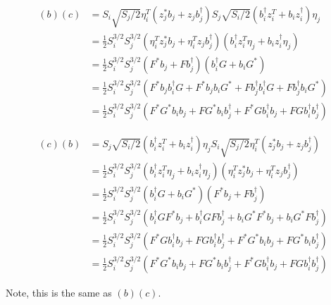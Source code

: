 \documentclass{article}
\begin{document}
\begin{align}
(b)(c) &= S_i \sqrt{S_j/2} \eta^T_i \left(z_j^* b_j + z_j b_j^\dagger\right) S_j \sqrt{S_i/2} \left(b_i^\dagger z_i^T + b_i z_i^\dagger \right) \eta_j \\
&= \frac{1}{2} S_i^{3/2} S_j^{3/2} \left(\eta^T_i z_j^* b_j + \eta^T_i z_j b_j^\dagger\right) \left(b_i^\dagger z_i^T \eta_j + b_i z_i^\dagger \eta_j\right) \\
&= \frac{1}{2} S_i^{3/2} S_j^{3/2} \left(F^* b_j + F b_j^\dagger\right) \left(b_i^\dagger G + b_i G^* \right) \\
&= \frac{1}{2} S_i^{3/2} S_j^{3/2} \left(
F^* b_j b_i^\dagger G +
F^* b_j b_i G^* +
F b_j^\dagger b_i^\dagger G +
F b_j^\dagger b_i G^*
\right) \\
&= \frac{1}{2} S_i^{3/2} S_j^{3/2} \left(
F^* G^* b_i b_j +
F G^* b_i b_j^\dagger +
F^* G b_i^\dagger b_j +
F G b_i^\dagger b_j^\dagger
\right)
\end{align}

\begin{align}
(c)(b) &= S_j \sqrt{S_i/2} \left(b_i^\dagger z_i^T + b_i z_i^\dagger \right) \eta_j S_i \sqrt{S_j/2} \eta^T_i \left(z_j^* b_j + z_j b_j^\dagger\right) \\
&= \frac{1}{2} S_i^{3/2} S_j^{3/2}  \left(b_i^\dagger z_i^T \eta_j + b_i z_i^\dagger \eta_j \right) \left(\eta^T_i z_j^* b_j + \eta^T_i z_j b_j^\dagger\right) \\
&= \frac{1}{2} S_i^{3/2} S_j^{3/2}  \left(b_i^\dagger G + b_i G^* \right) \left(F^* b_j + F b_j^\dagger\right) \\
&= \frac{1}{2} S_i^{3/2} S_j^{3/2}  \left(
b_i^\dagger G F^* b_j +
b_i^\dagger G F b_j^\dagger +
b_i G^* F^* b_j +
b_i G^* F b_j^\dagger
\right) \\
&= \frac{1}{2} S_i^{3/2} S_j^{3/2}  \left(
F^* G b_i^\dagger b_j +
F G b_i^\dagger b_j^\dagger +
F^* G^* b_i b_j +
F G^* b_i b_j^\dagger
\right) \\
&= \frac{1}{2} S_i^{3/2} S_j^{3/2}  \left(
F^* G^* b_i b_j  +
F G^* b_i b_j^\dagger +
F^* G b_i^\dagger b_j +
F G b_i^\dagger b_j^\dagger
\right)
\end{align}

Note, this is the same as $(b)(c)$.
\end{document}
